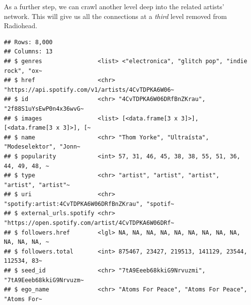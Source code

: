 \documentclass[
]{book}
\newenvironment{Shaded}{\begin{snugshade}}{\end{snugshade}}
\newcommand{\AttributeTok}[1]{\textcolor[rgb]{0.77,0.63,0.00}{#1}}
\newcommand{\DecValTok}[1]{\textcolor[rgb]{0.00,0.00,0.81}{#1}}
\newcommand{\FunctionTok}[1]{\textcolor[rgb]{0.00,0.00,0.00}{#1}}
\newcommand{\NormalTok}[1]{#1}
\newcommand{\OtherTok}[1]{\textcolor[rgb]{0.56,0.35,0.01}{#1}}
\newcommand{\SpecialCharTok}[1]{\textcolor[rgb]{0.00,0.00,0.00}{#1}}
\begin{document}
As a further step, we can crawl another level deep into the related artists' network. This will give us all the connections at a \emph{third} level removed from Radiohead.

\begin{Shaded}
\end{Shaded}

\begin{verbatim}
## Rows: 8,000
## Columns: 13
## $ genres                <list> <"electronica", "glitch pop", "indie rock", "ox~
## $ href                  <chr> "https://api.spotify.com/v1/artists/4CvTDPKA6W06~
## $ id                    <chr> "4CvTDPKA6W06DRfBnZKrau", "2f88S1uYsEwP0n4x36wvG~
## $ images                <list> [<data.frame[3 x 3]>], [<data.frame[3 x 3]>], [~
## $ name                  <chr> "Thom Yorke", "Ultraísta", "Modeselektor", "Jonn~
## $ popularity            <int> 57, 31, 46, 45, 38, 38, 55, 51, 36, 44, 49, 48, ~
## $ type                  <chr> "artist", "artist", "artist", "artist", "artist"~
## $ uri                   <chr> "spotify:artist:4CvTDPKA6W06DRfBnZKrau", "spotif~
## $ external_urls.spotify <chr> "https://open.spotify.com/artist/4CvTDPKA6W06DRf~
## $ followers.href        <lgl> NA, NA, NA, NA, NA, NA, NA, NA, NA, NA, NA, NA, ~
## $ followers.total       <int> 875467, 23427, 219513, 141129, 23544, 112534, 83~
## $ seed_id               <chr> "7tA9Eeeb68kkiG9Nrvuzmi", "7tA9Eeeb68kkiG9Nrvuzm~
## $ ego_name              <chr> "Atoms For Peace", "Atoms For Peace", "Atoms For~
\end{verbatim}
\end{document}
